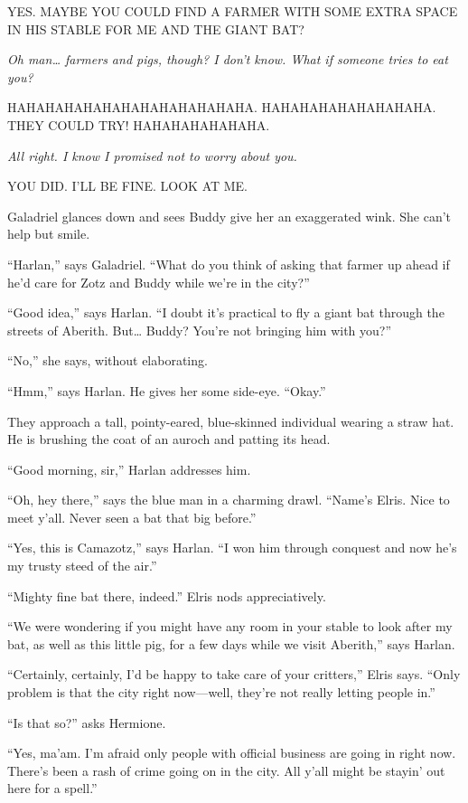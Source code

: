 \documentclass[smalldemyvopaper,11pt,twoside,onecolumn,openright,extrafontsizes]{memoir}
\begin{document}
YES. MAYBE YOU COULD FIND A FARMER WITH SOME EXTRA SPACE IN HIS STABLE
FOR ME AND THE GIANT BAT?

\emph{Oh man\ldots{} farmers and pigs, though? I don't know. What if
someone tries to eat you?}

HAHAHAHAHAHAHAHAHAHAHAHAHA. HAHAHAHAHAHAHAHAHA. THEY COULD TRY!
HAHAHAHAHAHAHA.

\emph{All right. I know I promised not to worry about you.}

YOU DID. I'LL BE FINE. LOOK AT ME.

Galadriel glances down and sees Buddy give her an exaggerated wink. She
can't help but smile.

``Harlan,'' says Galadriel. ``What do you think of asking that farmer up
ahead if he'd care for Zotz and Buddy while we're in the city?''

``Good idea,'' says Harlan. ``I doubt it's practical to fly a giant bat
through the streets of Aberith. But\ldots{} Buddy? You're not bringing
him with you?''

``No,'' she says, without elaborating.

``Hmm,'' says Harlan. He gives her some side-eye. ``Okay.''

They approach a tall, pointy-eared, blue-skinned individual wearing a
straw hat. He is brushing the coat of an auroch and patting its head.

``Good morning, sir,'' Harlan addresses him.

``Oh, hey there,'' says the blue man in a charming drawl. ``Name's
Elris. Nice to meet y'all. Never seen a bat that big before.''

``Yes, this is Camazotz,'' says Harlan. ``I won him through conquest and
now he's my trusty steed of the air.''

``Mighty fine bat there, indeed.'' Elris nods appreciatively.

``We were wondering if you might have any room in your stable to look
after my bat, as well as this little pig, for a few days while we visit
Aberith,'' says Harlan.

``Certainly, certainly, I'd be happy to take care of your critters,''
Elris says. ``Only problem is that the city right now---well, they're
not really letting people in.''

``Is that so?'' asks Hermione.

``Yes, ma'am. I'm afraid only people with official business are going in
right now. There's been a rash of crime going on in the city. All y'all
might be stayin' out here for a spell.''
\end{document}
